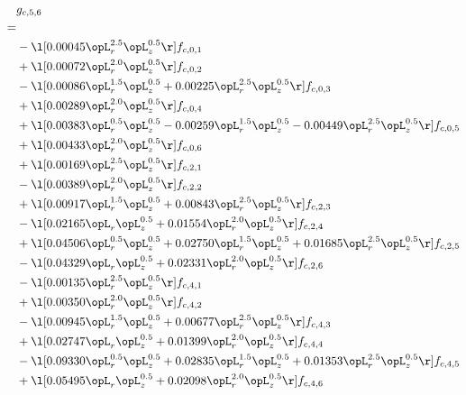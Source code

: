 \begin{alignat}{2} 
\label{eq:g_56_0} 
& g_{c,5,6} \nonumber \\ 
 = \\ 
& - \l[  0.00045 \opL_r^{2.5} \opL_z^{0.5}  \r] f_{c,0,1} \nonumber \\ 
& + \l[  0.00072 \opL_r^{2.0} \opL_z^{0.5}  \r] f_{c,0,2} \nonumber \\ 
& - \l[  0.00086 \opL_r^{1.5} \opL_z^{0.5} +  0.00225 \opL_r^{2.5} \opL_z^{0.5}  \r] f_{c,0,3} \nonumber \\ 
& + \l[  0.00289 \opL_r^{2.0} \opL_z^{0.5}  \r] f_{c,0,4} \nonumber \\ 
& + \l[  0.00383 \opL_r^{0.5} \opL_z^{0.5}   -0.00259 \opL_r^{1.5} \opL_z^{0.5}   -0.00449 \opL_r^{2.5} \opL_z^{0.5}  \r] f_{c,0,5} \nonumber \\ 
& + \l[  0.00433 \opL_r^{2.0} \opL_z^{0.5}  \r] f_{c,0,6} \nonumber \\ 
& + \l[  0.00169 \opL_r^{2.5} \opL_z^{0.5}  \r] f_{c,2,1} \nonumber \\ 
& - \l[  0.00389 \opL_r^{2.0} \opL_z^{0.5}  \r] f_{c,2,2} \nonumber \\ 
& + \l[  0.00917 \opL_r^{1.5} \opL_z^{0.5} +  0.00843 \opL_r^{2.5} \opL_z^{0.5}  \r] f_{c,2,3} \nonumber \\ 
& - \l[  0.02165 \opL_r \opL_z^{0.5} +  0.01554 \opL_r^{2.0} \opL_z^{0.5}  \r] f_{c,2,4} \nonumber \\ 
& + \l[  0.04506 \opL_r^{0.5} \opL_z^{0.5} +  0.02750 \opL_r^{1.5} \opL_z^{0.5} +  0.01685 \opL_r^{2.5} \opL_z^{0.5}  \r] f_{c,2,5} \nonumber \\ 
& - \l[  0.04329 \opL_r \opL_z^{0.5} +  0.02331 \opL_r^{2.0} \opL_z^{0.5}  \r] f_{c,2,6} \nonumber \\ 
& - \l[  0.00135 \opL_r^{2.5} \opL_z^{0.5}  \r] f_{c,4,1} \nonumber \\ 
& + \l[  0.00350 \opL_r^{2.0} \opL_z^{0.5}  \r] f_{c,4,2} \nonumber \\ 
& - \l[  0.00945 \opL_r^{1.5} \opL_z^{0.5} +  0.00677 \opL_r^{2.5} \opL_z^{0.5}  \r] f_{c,4,3} \nonumber \\ 
& + \l[  0.02747 \opL_r \opL_z^{0.5} +  0.01399 \opL_r^{2.0} \opL_z^{0.5}  \r] f_{c,4,4} \nonumber \\ 
& - \l[  0.09330 \opL_r^{0.5} \opL_z^{0.5} +  0.02835 \opL_r^{1.5} \opL_z^{0.5} +  0.01353 \opL_r^{2.5} \opL_z^{0.5}  \r] f_{c,4,5} \nonumber \\ 
& + \l[  0.05495 \opL_r \opL_z^{0.5} +  0.02098 \opL_r^{2.0} \opL_z^{0.5}  \r] f_{c,4,6} \nonumber \\ 

\end{alignat}
